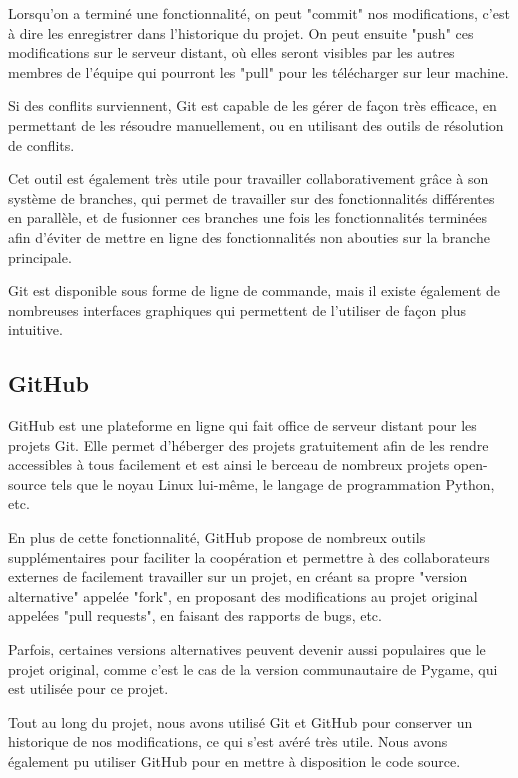 \documentclass[12pt]{scrreprt} %
\begin{document}
Lorsqu'on a terminé une fonctionnalité, on peut "commit" nos modifications, c'est à dire les enregistrer dans l'historique du projet. On peut ensuite "push" ces modifications sur le serveur distant, où elles seront visibles par les autres membres de l'équipe qui pourront les "pull" pour les télécharger sur leur machine.

Si des conflits surviennent, Git est capable de les gérer de façon très efficace, en permettant de les résoudre manuellement, ou en utilisant des outils de résolution de conflits.

Cet outil est également très utile pour travailler collaborativement grâce à son système de branches, qui permet de travailler sur des fonctionnalités différentes en parallèle, et de fusionner ces branches une fois les fonctionnalités terminées afin d'éviter de mettre en ligne des fonctionnalités non abouties sur la branche principale.

Git est disponible sous forme de ligne de commande, mais il existe également de nombreuses interfaces graphiques qui permettent de l'utiliser de façon plus intuitive.

\subsection{GitHub}

GitHub est une plateforme en ligne qui fait office de serveur distant pour les projets Git. Elle permet d'héberger des projets gratuitement afin de les rendre accessibles à tous facilement et est ainsi le berceau de nombreux projets open-source tels que le noyau Linux lui-même\cite{LinuxGithub2024}, le langage de programmation Python\cite{PythonGithub2024}, etc.

En plus de cette fonctionnalité, GitHub propose de nombreux outils supplémentaires pour faciliter la coopération et permettre à des collaborateurs externes de facilement travailler sur un projet, en créant sa propre "version alternative" appelée "fork", en proposant des modifications au projet original appelées "pull requests", en faisant des rapports de bugs, etc.

Parfois, certaines versions alternatives peuvent devenir aussi populaires que le projet original, comme c'est le cas de la version communautaire de Pygame, qui est utilisée pour ce projet.

Tout au long du projet, nous avons utilisé Git et GitHub pour conserver un historique de nos modifications, ce qui s'est avéré très utile. Nous avons également pu utiliser GitHub pour en mettre à disposition le code source.
\end{document}
